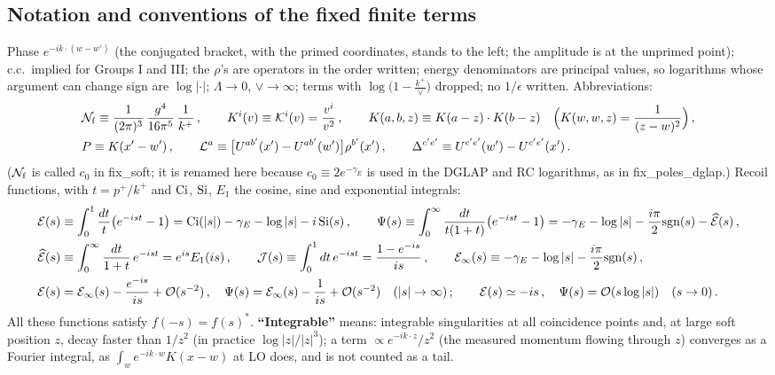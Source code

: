 \documentclass[9pt]{article}
\numberwithin{equation}{section}
\begin{document}
{\color{red}
\subsection*{Notation and conventions of the fixed finite terms}
 Phase $e^{-ik\cdot(w-w')}$ (the conjugated bracket, with the primed coordinates, stands to the left; the amplitude is at the unprimed point); c.c.\ implied for Groups I and III; the $\rho$'s are operators in the order written; energy denominators are principal values, so logarithms whose argument can change sign are $\log|\cdot|$; $\Lambda\to0$, $\vee\to\infty$; terms with $\log\big(1-\frac{k^{+}}{\vee}\big)$ dropped; no $1/\epsilon$ written. Abbreviations:
\begin{align}
&\mathcal{N}_{\rm f}\equiv\frac{1}{(2\pi)^{3}}\,\frac{g^{4}}{16\pi^{5}}\,\frac{1}{k^{+}}\,,\qquad K^{i}(v)\equiv\mathcal{K}^{i}(v)=\frac{v^{i}}{v^{2}}\,,\qquad K(a,b,z)\equiv K(a-z)\cdot K(b-z)\quad\Big(K(w,w,z)=\frac{1}{(z-w)^{2}}\Big)\,,\notag\\&P\equiv K(x'-w')\,,\qquad \mathcal{L}^{a}\equiv\big[U^{ab'}(x')-U^{ab'}(w')\big]\rho^{b'}(x')\,,\qquad \Delta^{c'e'}\equiv U^{c'e'}(w')-U^{c'e'}(x')\,.\notag
\end{align}
($\mathcal{N}_{\rm f}$ is called $c_{0}$ in fix\_soft; it is renamed here because $c_{0}\equiv2e^{-\gamma_{E}}$ is used in the DGLAP and RC logarithms, as in fix\_poles\_dglap.) Recoil functions, with $t=p^{+}/k^{+}$ and ${\rm Ci}$, ${\rm Si}$, $E_{1}$ the cosine, sine and exponential integrals:
\begin{align}
\mathcal{E}(s)&\equiv\int_{0}^{1}\frac{dt}{t}\big(e^{-ist}-1\big)=\mathrm{Ci}(|s|)-\gamma_{E}-\log|s|-i\,\mathrm{Si}(s)\,,\qquad
\Psi(s)\equiv\int_{0}^{\infty}\frac{dt}{t(1+t)}\big(e^{-ist}-1\big)=-\gamma_{E}-\log|s|-\frac{i\pi}{2}{\rm sgn}(s)-\widehat{\mathcal{E}}(s)\,,\notag\\
\widehat{\mathcal{E}}(s)&\equiv\int_{0}^{\infty}\frac{dt}{1+t}\,e^{-ist}=e^{is}E_{1}(is)\,,\qquad \mathcal{J}(s)\equiv\int_{0}^{1}dt\,e^{-ist}=\frac{1-e^{-is}}{is}\,,\qquad
\mathcal{E}_{\infty}(s)\equiv-\gamma_{E}-\log|s|-\frac{i\pi}{2}{\rm sgn}(s)\,,\label{eq:fx-fun}\\
\mathcal{E}(s)&=\mathcal{E}_{\infty}(s)-\frac{e^{-is}}{is}+{\cal O}(s^{-2})\,,\quad \Psi(s)=\mathcal{E}_{\infty}(s)-\frac{1}{is}+{\cal O}(s^{-2})\quad(|s|\to\infty)\,;\qquad \mathcal{E}(s)\simeq-is\,,\quad \Psi(s)={\cal O}(s\log|s|)\quad(s\to0)\,.\notag
\end{align}
All these functions satisfy $f(-s)=f(s)^{*}$. \textbf{``Integrable''} means: integrable singularities at all coincidence points and, at large soft position $z$, decay faster than $1/z^{2}$ (in practice $\log|z|/|z|^{3}$); a term $\propto e^{-ik\cdot z}/z^{2}$ (the measured momentum flowing through $z$) converges as a Fourier integral, as $\int_{w}e^{-ik\cdot w}K(x-w)$ at LO does, and is not counted as a tail.

}
\end{document}
